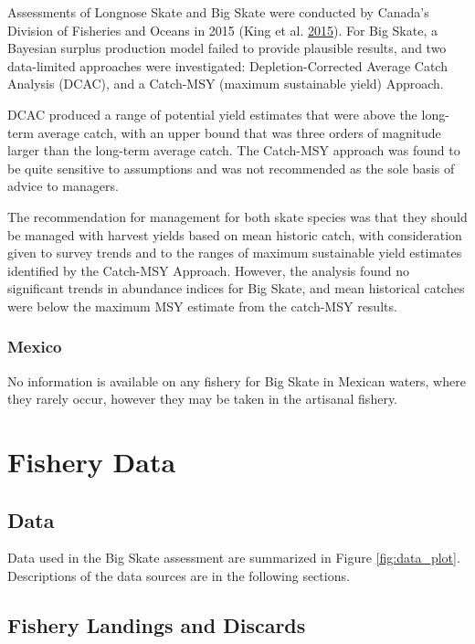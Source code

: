 \documentclass[12pt,]{article}
\begin{document}
Assessments of Longnose Skate and Big Skate were conducted by Canada's
Division of Fisheries and Oceans in 2015 (King et al.
\protect\hyperlink{ref-King2015}{2015}). For Big Skate, a Bayesian
surplus production model failed to provide plausible results, and two
data-limited approaches were investigated: Depletion-Corrected Average
Catch Analysis (DCAC), and a Catch-MSY (maximum sustainable yield)
Approach.

DCAC produced a range of potential yield estimates that were above the
long-term average catch, with an upper bound that was three orders of
magnitude larger than the long-term average catch. The Catch-MSY
approach was found to be quite sensitive to assumptions and was not
recommended as the sole basis of advice to managers.

The recommendation for management for both skate species was that they
should be managed with harvest yields based on mean historic catch, with
consideration given to survey trends and to the ranges of maximum
sustainable yield estimates identified by the Catch-MSY Approach.
However, the analysis found no significant trends in abundance indices
for Big Skate, and mean historical catches were below the maximum MSY
estimate from the catch-MSY results.

\hypertarget{mexico}{%
\subsubsection{Mexico}\label{mexico}}

No information is available on any fishery for Big Skate in Mexican
waters, where they rarely occur, however they may be taken in the
artisanal fishery.

\newpage

\hypertarget{fishery-data}{%
\section{Fishery Data}\label{fishery-data}}

\hypertarget{data}{%
\subsection{Data}\label{data}}

Data used in the Big Skate assessment are summarized in Figure
\ref{fig:data_plot}. Descriptions of the data sources are in the
following sections.

\hypertarget{fishery-landings-and-discards}{%
\subsection{Fishery Landings and
Discards}\label{fishery-landings-and-discards}}
\end{document}
